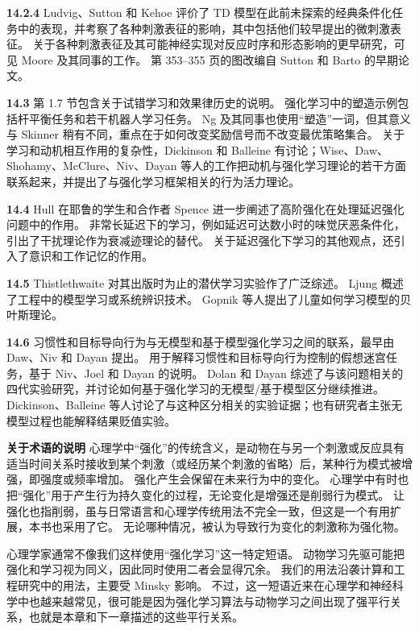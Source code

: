 \documentclass[UTF8, 12pt, fontset=fandol, oneside]{ctexart}
\begin{document}
\noindent\textbf{14.2.4}
Ludvig、Sutton 和 Kehoe 评价了 TD 模型在此前未探索的经典条件化任务中的表现，并考察了各种刺激表征的影响，其中包括他们较早提出的微刺激表征。
关于各种刺激表征及其可能神经实现对反应时序和形态影响的更早研究，可见 Moore 及其同事的工作。
第 353--355 页的图改编自 Sutton 和 Barto 的早期论文。

\noindent\textbf{14.3}
第 1.7 节包含关于试错学习和效果律历史的说明。
强化学习中的塑造示例包括杆平衡任务和若干机器人学习任务。
Ng 及其同事也使用“塑造”一词，但其意义与 Skinner 稍有不同，重点在于如何改变奖励信号而不改变最优策略集合。
关于学习和动机相互作用的复杂性，Dickinson 和 Balleine 有讨论；Wise、Daw、Shohamy、McClure、Niv、Dayan 等人的工作把动机与强化学习理论的若干方面联系起来，并提出了与强化学习框架相关的行为活力理论。

\noindent\textbf{14.4}
Hull 在耶鲁的学生和合作者 Spence 进一步阐述了高阶强化在处理延迟强化问题中的作用。
非常长延迟下的学习，例如延迟可达数小时的味觉厌恶条件化，引出了干扰理论作为衰减迹理论的替代。
关于延迟强化下学习的其他观点，还引入了意识和工作记忆的作用。

\noindent\textbf{14.5}
Thistlethwaite 对其出版时为止的潜伏学习实验作了广泛综述。
Ljung 概述了工程中的模型学习或系统辨识技术。
Gopnik 等人提出了儿童如何学习模型的贝叶斯理论。

\noindent\textbf{14.6}
习惯性和目标导向行为与无模型和基于模型强化学习之间的联系，最早由 Daw、Niv 和 Dayan 提出。
用于解释习惯性和目标导向行为控制的假想迷宫任务，基于 Niv、Joel 和 Dayan 的说明。
Dolan 和 Dayan 综述了与该问题相关的四代实验研究，并讨论如何基于强化学习的无模型/基于模型区分继续推进。
Dickinson、Balleine 等人讨论了与这种区分相关的实验证据；也有研究者主张无模型过程也能解释结果贬值实验。

\noindent\textbf{关于术语的说明}
心理学中“强化”的传统含义，是动物在与另一个刺激或反应具有适当时间关系时接收到某个刺激（或经历某个刺激的省略）后，某种行为模式被增强，即强度或频率增加。
强化产生会保留在未来行为中的变化。
心理学中有时也把“强化”用于产生行为持久变化的过程，无论变化是增强还是削弱行为模式。
让强化也指削弱，虽与日常语言和心理学传统用法不完全一致，但这是一个有用扩展，本书也采用了它。
无论哪种情况，被认为导致行为变化的刺激称为强化物。

心理学家通常不像我们这样使用“强化学习”这一特定短语。
动物学习先驱可能把强化和学习视为同义，因此同时使用二者会显得冗余。
我们的用法沿袭计算和工程研究中的用法，主要受 Minsky 影响。
不过，这一短语近来在心理学和神经科学中也越来越常见，很可能是因为强化学习算法与动物学习之间出现了强平行关系，也就是本章和下一章描述的这些平行关系。
\end{document}
